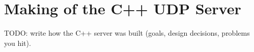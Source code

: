 \section{Making of the C++ UDP Server}
TODO: write how the C++ server was built (goals, design decisions, problems you hit).

